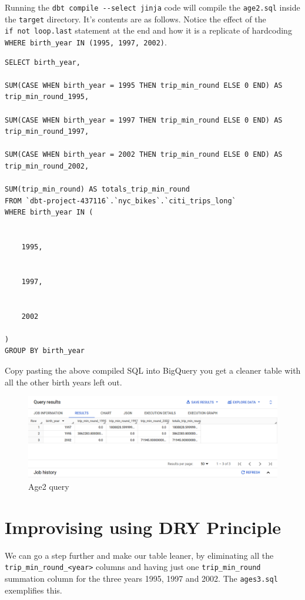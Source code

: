 \documentclass[
]{book}
\begin{document}
Running the \texttt{dbt\ compile\ -\/-select\ jinja} code will compile the \texttt{age2.sql} inside the \texttt{target} directory. It's contents are as follows. Notice the effect of the \texttt{if\ not\ loop.last} statement at the end and how it is a replicate of hardcoding \texttt{WHERE\ birth\_year\ IN\ (1995,\ 1997,\ 2002)}.

\begin{verbatim}
SELECT birth_year, 

SUM(CASE WHEN birth_year = 1995 THEN trip_min_round ELSE 0 END) AS trip_min_round_1995,

SUM(CASE WHEN birth_year = 1997 THEN trip_min_round ELSE 0 END) AS trip_min_round_1997,

SUM(CASE WHEN birth_year = 2002 THEN trip_min_round ELSE 0 END) AS trip_min_round_2002,

SUM(trip_min_round) AS totals_trip_min_round
FROM `dbt-project-437116`.`nyc_bikes`.`citi_trips_long`
WHERE birth_year IN (
  
  
    1995, 
  
  
    1997, 
  
  
    2002
  
)
GROUP BY birth_year
\end{verbatim}

Copy pasting the above compiled SQL into BigQuery you get a cleaner table with all the other birth years left out.

\begin{figure}
\centering
\includegraphics{./images/age2_query.png}
\caption{Age2 query}
\end{figure}

\hypertarget{improvising-using-dry-principle}{%
\section{Improvising using DRY Principle}\label{improvising-using-dry-principle}}

We can go a step further and make our table leaner, by eliminating all the \texttt{trip\_min\_round\_\textless{}year\textgreater{}} columns and having just one \texttt{trip\_min\_round} summation column for the three years 1995, 1997 and 2002. The \texttt{ages3.sql} exemplifies this.
\end{document}
